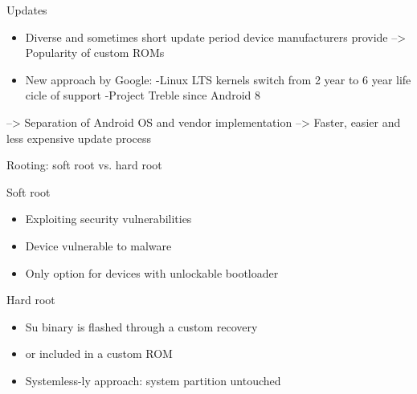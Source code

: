 \documentclass[
    11pt,%
    aspectratio=169,%
]{beamer}
\begin{document}
\begin{frame}{Updates}
\begin{itemize}
  \item Diverse and sometimes short update period device manufacturers provide\newline
  --> Popularity of custom ROMs\newline
  \item New approach by Google:\newline
  -Linux LTS kernels switch from 2 year to 6 year life cicle of support\newline
  -\alert{Project Treble} since Android 8\newline
  \end{itemize}
  -->  Separation of Android OS and vendor implementation\newline\newline
  -->  Faster, easier and less expensive update process

\end{frame}




\begin{frame}{Rooting: soft root vs. hard root}

\begin{exampleblock}{Soft root}
\begin{itemize}
  \item Exploiting security \alert{vulnerabilities}
  \item Device vulnerable to malware
  \item Only option for devices with unlockable bootloader
\end{itemize}
\end{exampleblock}
\begin{exampleblock}{Hard root}
\begin{itemize}
  \item \alert{Su} binary is flashed through a custom recovery
  \item or included in a custom ROM
  \item Systemless-ly approach: \alert{system} partition untouched
\end{itemize}
\end{exampleblock}

\end{frame}
\end{document}
